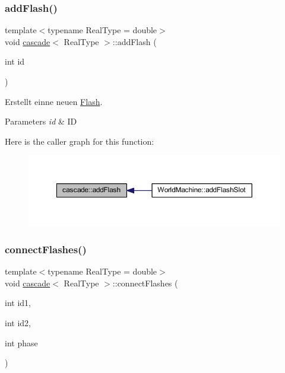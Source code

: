 \subsubsection{\texorpdfstring{add\+Flash()}{addFlash()}}
{\footnotesize\ttfamily template$<$typename Real\+Type = double$>$ \\
void \mbox{\hyperlink{classcascade}{cascade}}$<$ Real\+Type $>$\+::add\+Flash (\begin{DoxyParamCaption}\item[{int}]{id }\end{DoxyParamCaption})\hspace{0.3cm}{\ttfamily [inline]}}



Erstellt einne neuen \mbox{\hyperlink{class_flash}{Flash}}. 


\begin{DoxyParams}{Parameters}
{\em id} & ID \\
\hline
\end{DoxyParams}
Here is the caller graph for this function\+:\nopagebreak
\begin{figure}[H]
\begin{center}
\leavevmode
\includegraphics[width=350pt]{classcascade_a04cb46ee066fb830e25828fc28cec392_icgraph}
\end{center}
\end{figure}
\mbox{\label{classcascade_a6c0ead85f1c6cae57bcf8e4494ab340c}} 
\subsubsection{\texorpdfstring{connect\+Flashes()}{connectFlashes()}}
{\footnotesize\ttfamily template$<$typename Real\+Type = double$>$ \\
void \mbox{\hyperlink{classcascade}{cascade}}$<$ Real\+Type $>$\+::connect\+Flashes (\begin{DoxyParamCaption}\item[{int}]{id1,  }\item[{int}]{id2,  }\item[{int}]{phase }\end{DoxyParamCaption})\hspace{0.3cm}{\ttfamily [inline]}}




